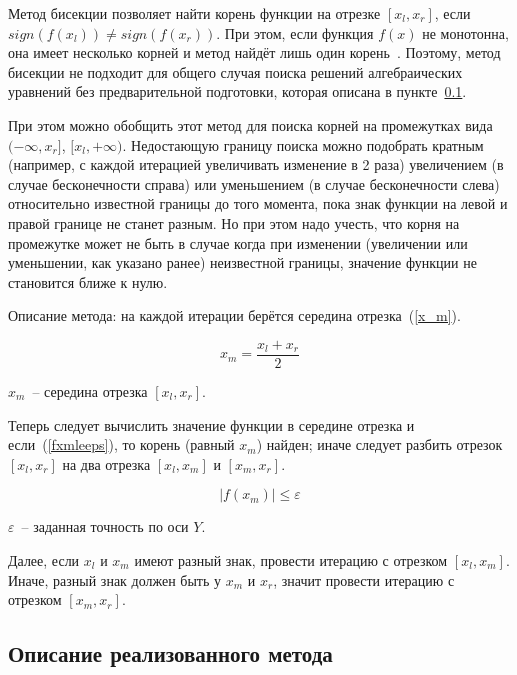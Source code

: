 Метод бисекции позволяет найти корень функции на отрезке \([x_l, x_r]\), если \(sign(f(x_l))\neq sign(f(x_r))\).
При этом, если функция \(f(x)\) не монотонна,
она имеет несколько корней и метод найдёт лишь один корень~\cite{bisectionkaw}.
Поэтому, метод бисекции не подходит для общего случая поиска решений алгебраических уравнений
без предварительной подготовки, которая описана в пункте~\ref{polynomialequation}.

При этом можно обобщить этот метод для поиска корней на промежутках вида \((-\infty, x_r]\), \([x_l, +\infty)\).
Недостающую границу поиска можно подобрать кратным (например, с каждой итерацией увеличивать изменение в 2 раза) увеличением (в случае бесконечности справа)
или уменьшением (в случае бесконечности слева) относительно известной границы до того момента, пока
знак функции на левой и правой границе не станет разным. Но при этом надо учесть, что корня на промежутке
может не быть в случае когда при изменении (увеличении или уменьшении, как указано ранее) неизвестной границы, значение функции не становится
ближе к нулю.

Описание метода: на каждой итерации берётся середина отрезка~(\ref{x_m}).

\begin{equation}\label{x_m}
  x_m = \frac{x_l + x_r}{2}
\end{equation}

\begin{Underequation}
  \(x_m\)~-- середина отрезка \([x_l, x_r]\).
\end{Underequation}

Теперь следует вычислить значение функции в середине отрезка и если~(\ref{fxmleeps}), то корень (равный \(x_m\)) найден;
иначе следует разбить отрезок \([x_l, x_r]\) на два отрезка \([x_l, x_m]\) и \([x_m, x_r]\).

\begin{equation}\label{fxmleeps}
  \left|f(x_m)\right| \leqslant \varepsilon
\end{equation}

\begin{Underequation}
  \(\varepsilon\)~-- заданная точность по оси \(Y\).
\end{Underequation}

Далее, если \(x_l\) и \(x_m\) имеют разный знак, провести итерацию с отрезком \([x_l, x_m]\).
Иначе, разный знак должен быть у  \(x_m\) и \(x_r\), значит провести итерацию с отрезком \([x_m, x_r]\).

\subsection{Описание реализованного метода}\label{polynomialequation}

